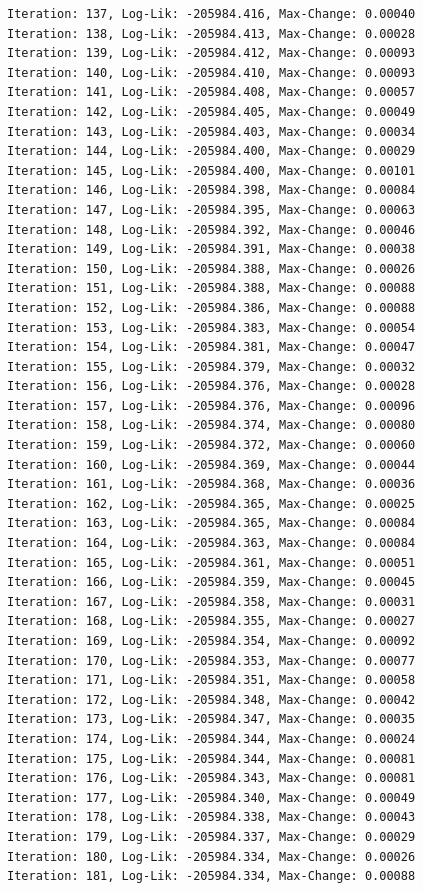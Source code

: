 \documentclass[
  letterpaper,
  DIV=11,
  numbers=noendperiod]{scrreport}
\begin{document}
\begin{verbatim}
Iteration: 137, Log-Lik: -205984.416, Max-Change: 0.00040
Iteration: 138, Log-Lik: -205984.413, Max-Change: 0.00028
Iteration: 139, Log-Lik: -205984.412, Max-Change: 0.00093
Iteration: 140, Log-Lik: -205984.410, Max-Change: 0.00093
Iteration: 141, Log-Lik: -205984.408, Max-Change: 0.00057
Iteration: 142, Log-Lik: -205984.405, Max-Change: 0.00049
Iteration: 143, Log-Lik: -205984.403, Max-Change: 0.00034
Iteration: 144, Log-Lik: -205984.400, Max-Change: 0.00029
Iteration: 145, Log-Lik: -205984.400, Max-Change: 0.00101
Iteration: 146, Log-Lik: -205984.398, Max-Change: 0.00084
Iteration: 147, Log-Lik: -205984.395, Max-Change: 0.00063
Iteration: 148, Log-Lik: -205984.392, Max-Change: 0.00046
Iteration: 149, Log-Lik: -205984.391, Max-Change: 0.00038
Iteration: 150, Log-Lik: -205984.388, Max-Change: 0.00026
Iteration: 151, Log-Lik: -205984.388, Max-Change: 0.00088
Iteration: 152, Log-Lik: -205984.386, Max-Change: 0.00088
Iteration: 153, Log-Lik: -205984.383, Max-Change: 0.00054
Iteration: 154, Log-Lik: -205984.381, Max-Change: 0.00047
Iteration: 155, Log-Lik: -205984.379, Max-Change: 0.00032
Iteration: 156, Log-Lik: -205984.376, Max-Change: 0.00028
Iteration: 157, Log-Lik: -205984.376, Max-Change: 0.00096
Iteration: 158, Log-Lik: -205984.374, Max-Change: 0.00080
Iteration: 159, Log-Lik: -205984.372, Max-Change: 0.00060
Iteration: 160, Log-Lik: -205984.369, Max-Change: 0.00044
Iteration: 161, Log-Lik: -205984.368, Max-Change: 0.00036
Iteration: 162, Log-Lik: -205984.365, Max-Change: 0.00025
Iteration: 163, Log-Lik: -205984.365, Max-Change: 0.00084
Iteration: 164, Log-Lik: -205984.363, Max-Change: 0.00084
Iteration: 165, Log-Lik: -205984.361, Max-Change: 0.00051
Iteration: 166, Log-Lik: -205984.359, Max-Change: 0.00045
Iteration: 167, Log-Lik: -205984.358, Max-Change: 0.00031
Iteration: 168, Log-Lik: -205984.355, Max-Change: 0.00027
Iteration: 169, Log-Lik: -205984.354, Max-Change: 0.00092
Iteration: 170, Log-Lik: -205984.353, Max-Change: 0.00077
Iteration: 171, Log-Lik: -205984.351, Max-Change: 0.00058
Iteration: 172, Log-Lik: -205984.348, Max-Change: 0.00042
Iteration: 173, Log-Lik: -205984.347, Max-Change: 0.00035
Iteration: 174, Log-Lik: -205984.344, Max-Change: 0.00024
Iteration: 175, Log-Lik: -205984.344, Max-Change: 0.00081
Iteration: 176, Log-Lik: -205984.343, Max-Change: 0.00081
Iteration: 177, Log-Lik: -205984.340, Max-Change: 0.00049
Iteration: 178, Log-Lik: -205984.338, Max-Change: 0.00043
Iteration: 179, Log-Lik: -205984.337, Max-Change: 0.00029
Iteration: 180, Log-Lik: -205984.334, Max-Change: 0.00026
Iteration: 181, Log-Lik: -205984.334, Max-Change: 0.00088

\end{verbatim}
\end{document}
